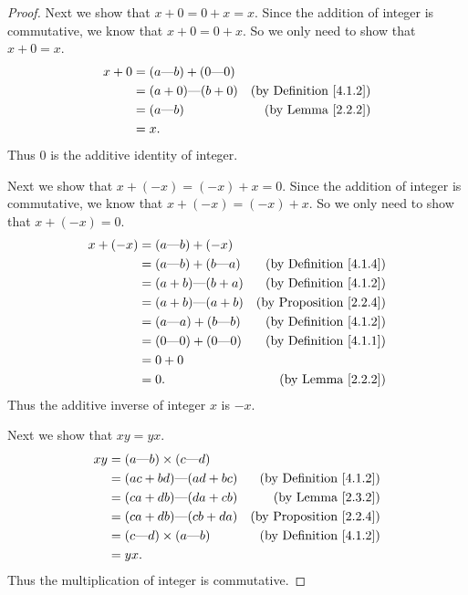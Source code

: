 \begin{proof}
    Next we show that \(x + 0 = 0 + x = x\).
    Since the addition of integer is commutative, we know that \(x + 0 = 0 + x\).
    So we only need to show that \(x + 0 = x\).
    \begin{align*}
        x + 0 & = (a \text{---} b) + (0 \text{---} 0)                                      \\
              & = (a + 0) \text{---} (b + 0)          & \text{(by Definition \ref{4.1.2})} \\
              & = (a \text{---} b)                    & \text{(by Lemma \ref{2.2.2})}      \\
              & = x.
    \end{align*}
    Thus \(0\) is the additive identity of integer.

    Next we show that \(x + (-x) = (-x) + x = 0\).
    Since the addition of integer is commutative, we know that \(x + (-x) = (-x) + x\).
    So we only need to show that \(x + (-x) = 0\).
    \begin{align*}
        x + (-x) & = (a \text{---} b) + (-x)                                                   \\
                 & = (a \text{---} b) + (b \text{---} a) & \text{(by Definition \ref{4.1.4})}  \\
                 & = (a + b) \text{---} (b + a)          & \text{(by Definition \ref{4.1.2})}  \\
                 & = (a + b) \text{---} (a + b)          & \text{(by Proposition \ref{2.2.4})} \\
                 & = (a \text{---} a) + (b \text{---} b) & \text{(by Definition \ref{4.1.2})}  \\
                 & = (0 \text{---} 0) + (0 \text{---} 0) & \text{(by Definition \ref{4.1.1})}  \\
                 & = 0 + 0                                                                     \\
                 & = 0.                                  & \text{(by Lemma \ref{2.2.2})}
    \end{align*}
    Thus the additive inverse of integer \(x\) is \(-x\).

    Next we show that \(xy = yx\).
    \begin{align*}
        xy & = (a \text{---} b) \times (c \text{---} d)                                       \\
           & = (ac + bd) \text{---} (ad + bc)           & \text{(by Definition \ref{4.1.2})}  \\
           & = (ca + db) \text{---} (da + cb)           & \text{(by Lemma \ref{2.3.2})}       \\
           & = (ca + db) \text{---} (cb + da)           & \text{(by Proposition \ref{2.2.4})} \\
           & = (c \text{---} d) \times (a \text{---} b) & \text{(by Definition \ref{4.1.2})}  \\
           & = yx.
    \end{align*}
    Thus the multiplication of integer is commutative.


\end{proof}
